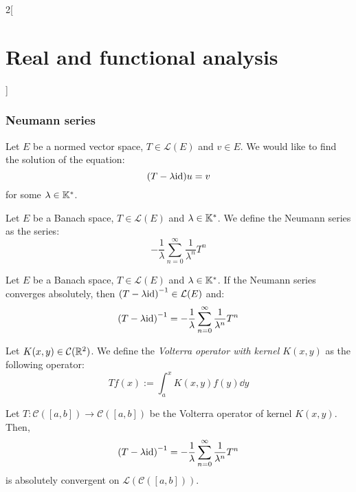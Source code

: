 \documentclass[../../../main_math.tex]{subfiles}
\begin{document}
\begin{multicols}{2}[\section{Real and functional analysis}]
  \subsubsection{Neumann series}
  \begin{definition}
    Let $E$ be a normed vector space, $T\in\mathcal{L}(E)$ and $v\in E$. We would like to find the solution of the equation: $$(T-\lambda\mathrm{id})u=v$$ for some $\lambda\in\mathbb{K}^*$.
  \end{definition}
  \begin{definition}
    Let $E$ be a Banach space, $T\in\mathcal{L}(E)$ and $\lambda\in\mathbb{K}^*$. We define the Neumann series as the series:
    $$-\frac{1}{\lambda}\sum_{n= 0}^\infty\frac{1}{\lambda^n}T^n$$
  \end{definition}
  \begin{theorem}
    Let $E$ be a Banach space, $T\in\mathcal{L}(E)$ and $\lambda\in\mathbb{K}^*$. If the Neumann series converges absolutely, then ${(T-\lambda\mathrm{id})}^{-1}\in\mathcal{L}(E)$ and: $${(T-\lambda\mathrm{id})}^{-1}=-\frac{1}{\lambda}\sum_{n= 0}^\infty\frac{1}{\lambda^n}T^n$$
  \end{theorem}
  \begin{definition}
    Let $K(x,y)\in\mathcal{C}(\mathbb{R}^2)$. We define the \emph{Volterra operator with kernel $K(x,y)$} as the following operator: $$Tf(x):=\int_a^xK(x,y)f(y)\dd{y}$$
  \end{definition}
  \begin{theorem}
    Let $T:\mathcal{C}([a,b])\rightarrow\mathcal{C}([a,b])$ be the Volterra operator of kernel $K(x,y)$. Then,
    $${(T-\lambda\mathrm{id})}^{-1}=-\frac{1}{\lambda}\sum_{n= 0}^\infty\frac{1}{\lambda^n}T^n$$
    is absolutely convergent on $\mathcal{L}(\mathcal{C}([a,b]))$.
  \end{theorem}

\end{multicols}
\end{document}
